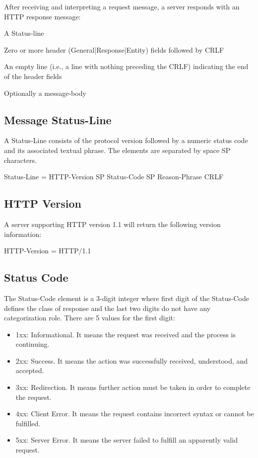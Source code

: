 \documentclass[a4paper,11pt,bahasa]{extarticle}
\begin{document}
After receiving and interpreting a request message, a server responds with an HTTP response message:
\begin{textcode}
    A Status-line

    Zero or more header (General|Response|Entity) fields followed by CRLF

    An empty line (i.e., a line with nothing preceding the CRLF) 
    indicating the end of the header fields

    Optionally a message-body
\end{textcode}

\subsection{Message Status-Line}

A Status-Line consists of the protocol version followed by a numeric status code and its associated 
textual phrase. The elements are separated by space SP characters.
\begin{textcode}
Status-Line = HTTP-Version SP Status-Code SP Reason-Phrase CRLF
\end{textcode}

\subsection{HTTP Version}

A server supporting HTTP version 1.1 will return the following version information:
\begin{textcode}
HTTP-Version = HTTP/1.1
\end{textcode}

\subsection{Status Code}

The Status-Code element is a 3-digit integer where first digit of the Status-Code defines the class of 
response and the last two digits do not have any categorization role. There are 5 values for the first 
digit:
\begin{itemize}
\item 1xx: Informational. It means the request was received and the process is continuing.
\item 2xx: Success. It means the action was successfully received, understood, and accepted.
\item 3xx: Redirection. It means further action must be taken in order to complete the request.
\item 4xx: Client Error. It means the request contains incorrect syntax or cannot be fulfilled.
\item 5xx: Server Error. It means the server failed to fulfill an apparently valid request.
\end{itemize}
\end{document}

